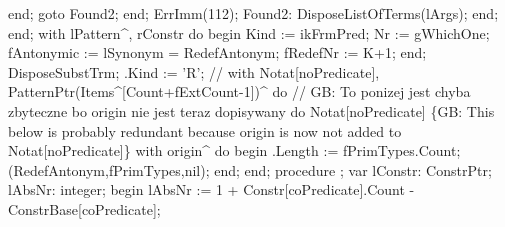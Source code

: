                end;
               goto Found2;
            end;
         ErrImm(112);
         Found2:
            DisposeListOfTerms(lArgs);
      end;
   end;
   with lPattern^, rConstr do
   begin
      Kind := ikFrmPred;
      Nr := gWhichOne;
      fAntonymic := lSynonym = RedefAntonym;
      fRedefNr :=  K+1;
   end;
   DisposeSubstTrm;
   .Kind := 'R';
   // with Notat[noPredicate], PatternPtr(Items^[Count+fExtCount-1])^ do
   //  GB: To ponizej jest chyba zbyteczne bo origin nie jest teraz dopisywany do Notat[noPredicate]
   \{GB: This below is probably redundant because origin is now not added to Notat[noPredicate]\} 
   with origin^ do
   begin
      .Length := fPrimTypes.Count;
      (RedefAntonym,fPrimTypes,nil);
   end;
end;
\eatline
{}\nwendcode{}\nwdocspar
\nwenddocs{}\endmoddef\nwstartdeflinemarkup{}\nwenddeflinemarkup
procedure ;
var
   lConstr: ConstrPtr;
   lAbsNr: integer;
begin
   lAbsNr :=  1 + Constr[coPredicate].Count - ConstrBase[coPredicate];
